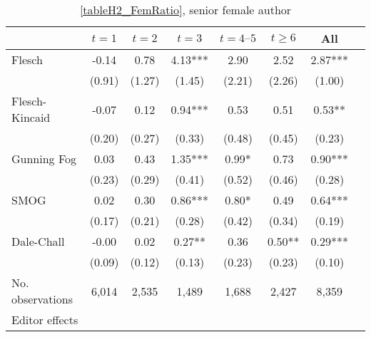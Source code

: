 \begin{table}
    \footnotesize
    \centering
    \begin{threeparttable}
        \caption{\autoref{tableH2_FemRatio}, senior female author}
        \label{tableH2_FemSenior}
        \begin{tabular}{p{3cm}S@{}S@{}S@{}S@{}S@{}S@{}S@{}}
            \toprule
            &{\(t=1\)}&{\(t=2\)}&{\(t=3\)}&{\(t=4\text{--}5\)}&{\(t\ge6\)}&{All}\\
            \midrule
            Flesch                        &       -0.14   &        0.78   &        4.13***&        2.90   &        2.52   &        2.87***\\
                                          &      (0.91)   &      (1.27)   &      (1.45)   &      (2.21)   &      (2.26)   &      (1.00)   \\
            Flesch-Kincaid                &       -0.07   &        0.12   &        0.94***&        0.53   &        0.51   &        0.53** \\
                                          &      (0.20)   &      (0.27)   &      (0.33)   &      (0.48)   &      (0.45)   &      (0.23)   \\
            Gunning Fog                   &        0.03   &        0.43   &        1.35***&        0.99*  &        0.73   &        0.90***\\
                                          &      (0.23)   &      (0.29)   &      (0.41)   &      (0.52)   &      (0.46)   &      (0.28)   \\
            SMOG                          &        0.02   &        0.30   &        0.86***&        0.80*  &        0.49   &        0.64***\\
                                          &      (0.17)   &      (0.21)   &      (0.28)   &      (0.42)   &      (0.34)   &      (0.19)   \\
            Dale-Chall                    &       -0.00   &        0.02   &        0.27** &        0.36   &        0.50** &        0.29***\\
                                          &      (0.09)   &      (0.12)   &      (0.13)   &      (0.23)   &      (0.23)   &      (0.10)   \\
            \midrule
            No. observations              &       6,014   &       2,535   &       1,489   &       1,688   &       2,427   &       8,359   \\
            \midrule
            Editor effects       &           {}   &           {}   &           {}   &           {}   &           {}   &           {}   \\

\end{tabular}
\end{threeparttable}
\end{table}
